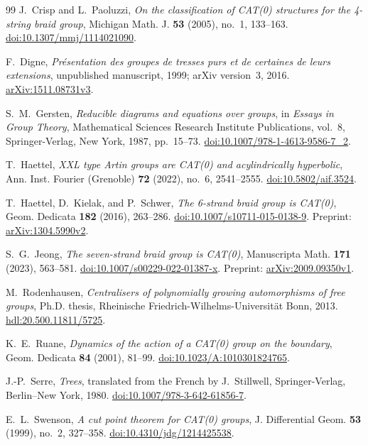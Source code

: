 \begin{thebibliography}{99}
J.~Crisp and L.~Paoluzzi,
\emph{On the classification of CAT(0) structures for the 4-string braid group},
Michigan Math. J. \textbf{53} (2005), no.~1, 133--163.
\href{https://doi.org/10.1307/mmj/1114021090}{doi:10.1307/mmj/1114021090}.

F.~Digne,
\emph{Pr\'esentation des groupes de tresses purs et de certaines de leurs extensions},
unpublished manuscript, 1999; arXiv version~3, 2016.
\href{https://arxiv.org/abs/1511.08731v3}{arXiv:1511.08731v3}.

S.~M.~Gersten,
\emph{Reducible diagrams and equations over groups},
in \emph{Essays in Group Theory},
Mathematical Sciences Research Institute Publications, vol.~8,
Springer-Verlag, New York, 1987, pp.~15--73.
\href{https://doi.org/10.1007/978-1-4613-9586-7_2}{doi:10.1007/978-1-4613-9586-7\_2}.

T.~Haettel,
\emph{XXL type Artin groups are CAT(0) and acylindrically hyperbolic},
Ann. Inst. Fourier (Grenoble) \textbf{72} (2022), no.~6, 2541--2555.
\href{https://doi.org/10.5802/aif.3524}{doi:10.5802/aif.3524}.

T.~Haettel, D.~Kielak, and P.~Schwer,
\emph{The 6-strand braid group is CAT(0)},
Geom. Dedicata \textbf{182} (2016), 263--286.
\href{https://doi.org/10.1007/s10711-015-0138-9}{doi:10.1007/s10711-015-0138-9}.
Preprint:
\href{https://arxiv.org/abs/1304.5990v2}{arXiv:1304.5990v2}.

S.~G.~Jeong,
\emph{The seven-strand braid group is CAT(0)},
Manuscripta Math. \textbf{171} (2023), 563--581.
\href{https://doi.org/10.1007/s00229-022-01387-x}{doi:10.1007/s00229-022-01387-x}.
Preprint:
\href{https://arxiv.org/abs/2009.09350v1}{arXiv:2009.09350v1}.

M.~Rodenhausen,
\emph{Centralisers of polynomially growing automorphisms of free groups},
Ph.D. thesis, Rheinische Friedrich-Wilhelms-Universit\"at Bonn, 2013.
\href{https://hdl.handle.net/20.500.11811/5725}{hdl:20.500.11811/5725}.

K.~E.~Ruane,
\emph{Dynamics of the action of a CAT(0) group on the boundary},
Geom. Dedicata \textbf{84} (2001), 81--99.
\href{https://doi.org/10.1023/A:1010301824765}{doi:10.1023/A:1010301824765}.

J.-P.~Serre,
\emph{Trees},
translated from the French by J.~Stillwell,
Springer-Verlag, Berlin--New York, 1980.
\href{https://doi.org/10.1007/978-3-642-61856-7}{doi:10.1007/978-3-642-61856-7}.

E.~L.~Swenson,
\emph{A cut point theorem for CAT(0) groups},
J. Differential Geom. \textbf{53} (1999), no.~2, 327--358.
\href{https://doi.org/10.4310/jdg/1214425538}{doi:10.4310/jdg/1214425538}.

\end{thebibliography}
